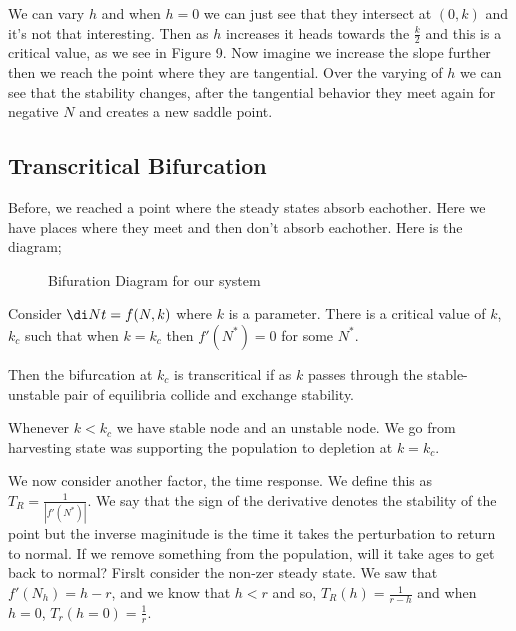 \noindent
We can vary $h$ and when $h = 0$ we can just see that they intersect at $(0, k)$ and it's not that interesting. Then as $h$ increases it heads towards the $\frac{k }{2}$ and this is a critical value, as we see in Figure 9. Now imagine we increase the slope further then we reach the point where they are tangential. Over the varying of $h$ we can see that the stability changes, after the tangential behavior they meet again for negative $N$ and creates a new saddle point.

\newpage
\subsection{Transcritical Bifurcation}
Before, we reached a point where the steady states absorb eachother. Here we have places where they meet and then don't absorb eachother. Here is the diagram;
\begin{figure}[!ht]
\centering
{}
\caption{Bifuration Diagram for our system}
\end{figure}

Consider $\di N t = f(N, k)$ where $k$ is a parameter. There is a critical value of $k$, $k_c$ such that when $k = k_c$ then $f'(N^*) = 0$ for some $N^*$.
\begin{ndefi}
  Then the bifurcation at $k_c$ is transcritical if as $k$ passes through the stable-unstable pair of equilibria collide and exchange stability.
\end{ndefi}

\noindent
Whenever $k < k_c$ we have stable node and an unstable node. We go from harvesting state was supporting the population to depletion at $k = k_c$.

We now consider another factor, the time response. We define this as $T_R = \frac{1}{|f'(N^*)|}$. We say that the sign of the derivative denotes the stability of the point but the inverse maginitude is the time it takes the perturbation to return to normal. If we remove something from the population, will it take ages to get back to normal? Firslt consider the non-zer steady state. We saw that $f'(N_h) = h - r$, and we know that $h < r$ and so, $T_R(h) = \frac{1 }{r - h }$ and when $h = 0$, $T_r (h = 0) = \frac{1 }{r}$.\\

